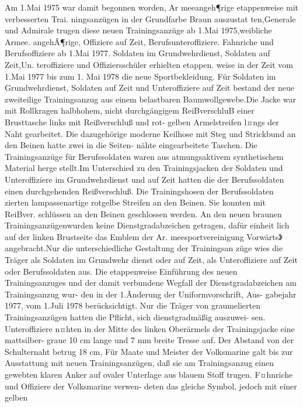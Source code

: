 

Am 1.Mai 1975 war damit begonnen worden, Ar
meeangeh¶rige etappenweise mit verbesserten Trai.
ningsanzügen in der Grundfarbe Braun auszustat
ten,Generale und Admirale trugen diese neuen
Trainingsanzüge ab 1.Mai 1975,weibliche Armee.
angehÃ¶rige, Offiziere auf Zeit, Berufsunteroffiziere.
Fahnriche und Berufsoffiziere ab 1.Mai 1977. Soldaten im Grundwehrdienst, Soldaten auf Zeit,Un.
teroffiziere und Offiziersschüler erhielten etappen.
weise in der Zeit vom 1.Mai 1977 bis zum 1. Mai
1978 die neue Sportbekleidung.
Für Soldaten im Grundwehrdienst, Soldaten auf
Zeit und Unteroffiziere auf Zeit bestand der neue
zweiteilige Trainingsanzug aus einem belastbaren
Baumwollgewebe.Die Jacke war mit Rollkragen
halbhohem, nicht durchgängigem ReiBverschluB
einer Brusttasche links mit Reißverschluß und rot-
gelben Armelstreifen l¤ngs der Naht gearbeitet. Die
dazugehörige moderne Keilhose mit Steg und
Strickbund an den Beinen hatte zwei in die Seiten-
nähte eingearbeitete Taschen.
Die Trainingsanzüge für Berufssoldaten waren
aus atmungsaktivem synthetischem Material herge
stellt.Im Unterschied zu den Trainingsjacken der
Soldaten und Unteroffiziere im Grundwehrdienst
und auf Zeit hatten die der Berufssoldaten einen
durchgehenden Reißverschluß. Die Trainingshosen
der Berufssoldaten zierten lampassenartige rotgelbe
Streifen an den Beinen. Sie konnten mit ReiBver.
schlüssen an den Beinen geschlossen werden. An
den neuen braunen Trainingsanzügenwurden
keine Dienstgradabzeichen getragen, dafür einheit
lich auf der linken Brustseite das Emblem der Ar.
meesportvereinigung Vorwärts》angebracht.Nur
die unterschiedliche
Gestaltung der Trainingsan
züge wies die Träger als Soldaten im Grundwehr
dienst oder auf Zeit, als Unteroffiziere auf Zeit oder
Berufssoldaten aus.
Die etappenweise Einführung des neuen Trainingsanzuges und der damit verbundene Wegfall
der Dienstgradabzeichen am Trainingsanzug wur-
den in der 1.Ãnderung der Uniformvorschrift, Aus-
gabejahr 1977, vom 1.Juli 1978 berücksichtigt. Nur
die Träger von graumelierten Trainingsanzügen
hatten die Pflicht, sich dienstgradmäßig auszuwei-
sen. Unteroffiziere n¤hten in der Mitte des linken
Oberärmels der Trainingsjacke eine mattsilber-
graue 10 cm lange und 7 mm breite Tresse auf. Der
Abstand von der Schulternaht betrug 18 cm, Für
Maate und Meister der Volksmarine galt bis zur
Ausstattung mit neuen Trainingsanzügen, daß sie
am Trainingsanzug einen gewebten klaren Anker
auf ovaler Unterlage aus blauem Stoff trugen.
F¤hnriche und Offiziere der Volksmarine verwen-
deten das gleiche Symbol, jedoch mit einer gelben
